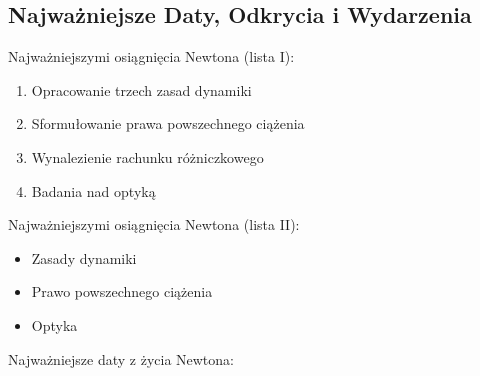 \subsection{Najważniejsze Daty, Odkrycia i Wydarzenia}

Najważniejszymi osiągnięcia Newtona (lista I):

\begin{enumerate}
    \item Opracowanie trzech zasad dynamiki
    \item Sformułowanie prawa powszechnego ciążenia
    \item Wynalezienie rachunku różniczkowego
    \item Badania nad optyką
\end{enumerate}

Najważniejszymi osiągnięcia Newtona (lista II):

\begin{itemize}
    \renewcommand\labelitemi{--}
    \item Zasady dynamiki
    \item Prawo powszechnego ciążenia
    \item Optyka
\end{itemize}


Najważniejsze daty z życia Newtona:

